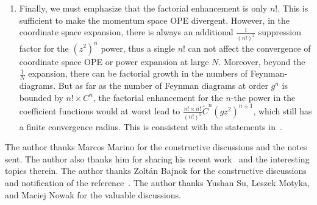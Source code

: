 \documentclass[a4paper,11pt]{article}
\begin{document}
\begin{enumerate}
\item Finally, we must emphasize that the factorial enhancement is only $n!$. This is sufficient to make the momentum space OPE divergent. However, in the coordinate space expansion, there is always an additional $\frac{1}{(n!)^2}$ suppression factor for the $(z^2)^n$ power, thus a single $n!$ can not affect the convergence of coordinate space OPE or power expansion at large $N$. Moreover, beyond the $\frac{1}{N}$ expansion, there can be factorial growth in the numbers of Feynman-diagrams. But as far as the number of Feynman diagrams at order $g^n$ is bounded by $n!\times C^n$, the factorial enhancement for the $n$-the power in the coefficient functions would at worst lead to $\frac{n!\times n!}{(n!)^2}\tilde C^n (gz^2)^{n\pm 1}$, which still has a finite convergence radius. This is consistent with the statements in~\cite{Lukyanov:1996jj}. 
\end{enumerate} 

\acknowledgments
The author thanks Marcos Marino for the constructive discussions and the notes sent. The author also thanks him for sharing his recent work~\cite{Marino:2025ido} and the interesting topics therein. The author thanks Zoltán Bajnok for the constructive discussions and notification of the reference~\cite{Zamolodchikov:1990bk}. The author thanks Yushan Su, Leszek Motyka, and Maciej Nowak for the valuable discussions. 


\appendix
\end{document}
